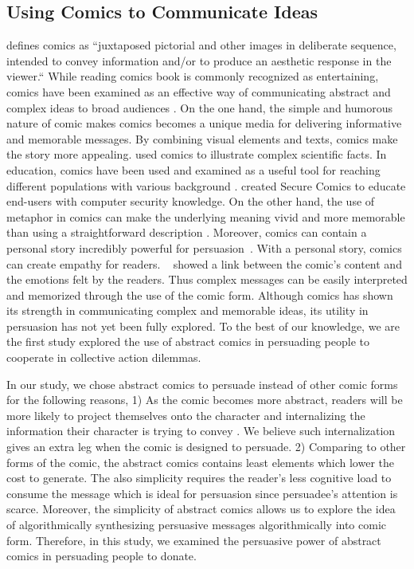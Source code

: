 \subsection{Using Comics to Communicate Ideas}
\textcite{scott1993understanding} defines comics as ``juxtaposed pictorial and other images in deliberate sequence, intended to convey information and/or to produce an aesthetic response in the viewer.`` While reading comics book is commonly recognized as entertaining, comics have been examined as an effective way of communicating abstract and complex ideas to broad audiences \cite{McDermottPB18,cary2004going,scott1993understanding, Zhang-Kennedy:2017:SCI:3206217.3206282}. On the one hand, the simple and humorous nature of comic makes comics becomes a unique media for delivering informative and memorable messages. By combining visual elements and texts, comics make the story more appealing. \textcite{McDermottPB18} used comics to illustrate complex scientific facts. In education, comics have been used and examined as a useful tool for reaching different populations with various background \cite{McDermottPB18,cary2004going,scott1993understanding}. \textcite{Zhang-Kennedy:2017:SCI:3206217.3206282} created Secure Comics to educate end-users with computer security knowledge. On the other hand, the use of metaphor in comics can make the underlying meaning vivid and more memorable than using a straightforward description \cite{McDermottPB18,scott1993understanding}. Moreover, comics can contain a personal story incredibly powerful for persuasion~\cite{weaver2017losing}. With a personal story, comics can create empathy for readers. ~\textcite{matsubara2016emotional} showed a link between the comic's content and the emotions felt by the readers. Thus complex messages can be easily interpreted and memorized through the use of the comic form. Although comics has shown its strength in communicating complex and memorable ideas, its utility in persuasion has not yet been fully explored. To the best of our knowledge, we are the first study explored the use of abstract comics in persuading people to cooperate in collective action dilemmas.  

In our study, we chose abstract comics to persuade instead of other comic forms for the following reasons, 1) As the comic becomes more abstract, readers will be more likely to project themselves onto the character and internalizing the information their character is trying to convey \textcite{scott1993understanding}. We believe such internalization gives an extra leg when the comic is designed to persuade. 2) Comparing to other forms of the comic, the abstract comics contains least elements which lower the cost to generate. The also simplicity requires the reader's less cognitive load to consume the message which is ideal for persuasion since persuadee's attention is scarce. Moreover, the simplicity of abstract comics allows us to explore the idea of algorithmically synthesizing persuasive messages algorithmically into comic form. Therefore, in this study, we examined the persuasive power of abstract comics in persuading people to donate.

